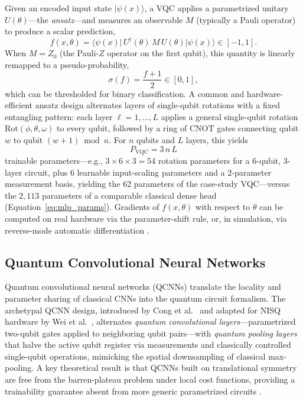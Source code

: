 \documentclass[11pt,a4paper]{article}
\begin{document}
Given an encoded input state $\lvert \psi(x) \rangle$, a VQC applies a
parametrized unitary $U(\theta)$---the \emph{ansatz}---and measures an
observable $M$ (typically a Pauli operator) to produce a scalar prediction,
\begin{equation}
  f(x, \theta) = \langle \psi(x) \rvert\, U^{\dagger}(\theta)\, M\,
  U(\theta) \lvert \psi(x) \rangle \in [-1, 1].
  \label{eq:vqc}
\end{equation}
When $M = Z_0$ (the Pauli-$Z$ operator on the first qubit), this quantity is
linearly remapped to a pseudo-probability,
\begin{equation}
  \sigma(f) = \frac{f + 1}{2} \in [0, 1],
  \label{eq:sigmoid_remap}
\end{equation}
which can be thresholded for binary classification.  A common and
hardware-efficient ansatz design alternates layers of single-qubit rotations
with a fixed entangling pattern: each layer $\ell = 1,\dots,L$ applies a
general single-qubit rotation $\mathrm{Rot}(\phi,\theta,\omega)$ to every
qubit, followed by a ring of CNOT gates connecting qubit $w$ to qubit
$(w+1) \bmod n$.  For $n$ qubits and $L$ layers, this yields
\begin{equation}
  P_{\text{VQC}} = 3\, n\, L
  \label{eq:vqc_params}
\end{equation}
trainable parameters---e.g., $3 \times 6 \times 3 = 54$ rotation parameters
for a 6-qubit, 3-layer circuit, plus 6 learnable input-scaling parameters
and a 2-parameter measurement basis, yielding the 62 parameters of the
case-study VQC---versus the $2{,}113$ parameters of a
comparable classical dense head (Equation~\ref{eq:mlp_params}).  Gradients
of $f(x,\theta)$ with respect to $\theta$ can be computed on real hardware
via the parameter-shift rule, or, in simulation, via reverse-mode automatic
differentiation \cite{mitarai2018}.

\subsection{Quantum Convolutional Neural Networks}
\label{sec:qcnn}

Quantum convolutional neural networks (QCNNs) translate the locality and
parameter sharing of classical CNNs into the quantum circuit formalism.  The
archetypal QCNN design, introduced by Cong et al.~\cite{cong2019} and adapted
for NISQ hardware by Wei et al.~\cite{wei2022}, alternates \emph{quantum
convolutional layers}---parametrized two-qubit gates applied to neighboring
qubit pairs---with \emph{quantum pooling layers} that halve the active qubit
register via measurements and classically controlled single-qubit operations,
mimicking the spatial downsampling of classical max-pooling.  A key theoretical
result is that QCNNs built on translational symmetry are free from the barren-plateau problem
under local cost functions, providing a trainability guarantee absent from
more generic parametrized circuits \cite{pesah2021}.
\end{document}

